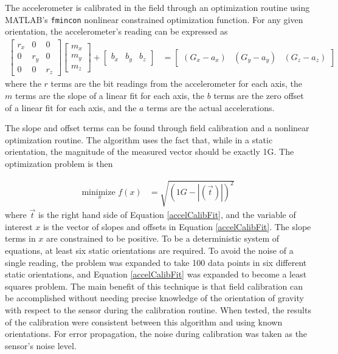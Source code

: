 The accelerometer is calibrated in the field through an optimization routine using MATLAB's \texttt{fmincon} nonlinear constrained optimization function. For any given orientation, the accelerometer's reading can be expressed as
\begin{align}
\label{accelCalibFit}
\begin{bmatrix}
r_x & 0 & 0\\ 0 & r_y & 0\\ 0 & 0 & r_z
\end{bmatrix} 
\begin{bmatrix}
m_x \\ m_y \\ m_z
\end{bmatrix} 
+ \begin{bmatrix}
b_x & b_y & b_z
\end{bmatrix}&= \begin{bmatrix} (G_x-a_x) & (G_y - a_y) & (G_z - a_z) \end{bmatrix}
\end{align}
\noindent
where the $r$ terms are the bit readings from the accelerometer for each axis, the $m$ terms are the slope of a linear fit for each axis, the $b$ terms are the zero offset of a linear fit for each axis, and the $a$ terms are the actual accelerations.
 
 The slope and offset terms can be found through field calibration and a nonlinear optimization routine. The algorithm uses the fact that, while in a static orientation, the magnitude of the measured vector should be exactly 1G. The optimization problem is then

\begin{align}
\underset{x}{\text{minimize }} f(x) &= \sqrt{(1G-|(\vec{t})|)^2}
\end{align}
\noindent
where $\vec{t}$ is the right hand side of Equation \ref{accelCalibFit}, and the variable of interest $x$ is the vector of slopes and offsets in Equation \ref{accelCalibFit}. The slope terms in $x$ are constrained to be positive. To be a deterministic system of equations, at least six static orientations are required. To avoid the noise of a single reading, the problem was expanded to take 100 data points in six different static orientations, and Equation \ref{accelCalibFit} was expanded to become a least squares problem. The main benefit of this technique is that field calibration can be accomplished without needing precise knowledge of the orientation of gravity with respect to the sensor during the calibration routine. When tested, the results of the calibration were consistent between this algorithm and using known orientations. For error propagation, the noise during calibration was taken as the sensor's noise level.

